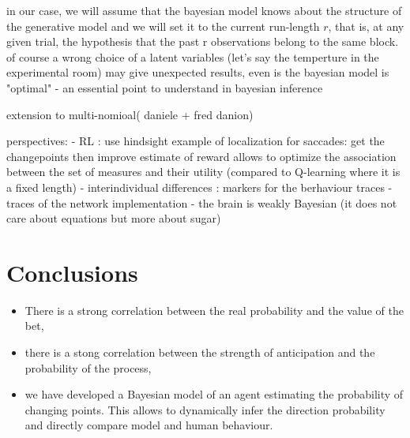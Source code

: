 \documentclass[profile,final,english, draft]{article}%
\newcommand{\citep}[1]{(\cite{#1})}
\begin{document}
in our case, we will assume that the bayesian model knows about the structure of the generative model and we will set it to the current run-length $r$, that is, at any given trial, the hypothesis that the past r observations belong to the same block. of course a wrong choice of a latent variables (let's say the temperture in the experimental room) may give unexpected results, even is the bayesian model is "optimal" - an essential point to understand in bayesian inference

extension to multi-nomioal( daniele + fred danion)





perspectives:
- RL : use hindsight example of localization for saccades: get the changepoints then improve estimate of reward allows to optimize the association between the set of measures and their utility (compared to Q-learning where it is a fixed length)
- interindividual differences : markers for the berhaviour traces - traces of the network implementation
- the brain is weakly Bayesian (it does not care about equations but more about sugar)



\section{Conclusions}


\begin{itemize}\setlength{\itemsep}{0ex}
\item There is a strong correlation between the real probability and the value of the bet,

\item there is a stong correlation between the strength of anticipation and the probability of the process,

\item we have developed a Bayesian model of an agent estimating the probability of changing points. This allows to dynamically infer the direction probability and directly compare model and human behaviour.

\end{itemize}
\end{document}
